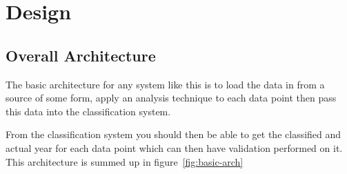 \chapter{Design}








\section{Overall Architecture}
The basic architecture for any system like this is to load the data in from a source of some form,
apply an analysis technique to each data point then pass this data into the classification system.

From the classification system you should then be able to get the classified and actual year for
each data point which can then have validation performed on it. This architecture is summed up in
figure~\ref{fig:basic-arch}

